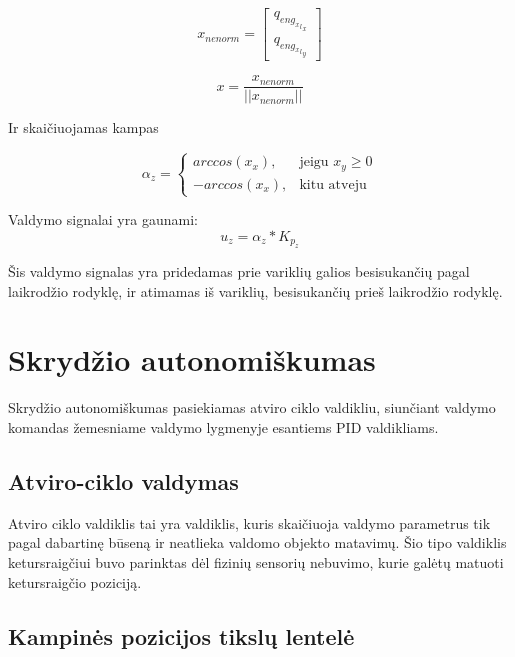 \documentclass[12pt, a4paper, lithuanian, final]{article}
\begin{document}
\begin{equation}
	x_{nenorm} = \left[
		\begin{array}{c}
			q_{{{eng_x}_l}_x} \\
			q_{{{eng_x}_l}_y}
		\end{array}
	\right]
\end{equation}

\begin{equation}
	x = \dfrac{x_{nenorm}}{||x_{nenorm}||}
\end{equation}

Ir skaičiuojamas kampas

\begin{equation}
	\alpha_z = \begin{cases}
		arccos(x_x), & \text{jeigu } x_y \geq 0\\
		-arccos(x_x), & \text{kitu atveju}
	\end{cases}
\end{equation}

Valdymo signalai yra gaunami: 
\begin{equation}
	u_z = \alpha_z * K_{p_z}
\end{equation}

Šis valdymo signalas yra pridedamas prie variklių galios besisukančių pagal laikrodžio rodyklę, ir atimamas iš variklių, besisukančių prieš laikrodžio rodyklę.




\section{Skrydžio autonomiškumas}
\label{skyr-autonomus}

Skrydžio autonomiškumas pasiekiamas atviro ciklo valdikliu, siunčiant valdymo komandas žemesniame valdymo lygmenyje esantiems PID valdikliams.

\subsection{Atviro-ciklo valdymas}

Atviro ciklo valdiklis tai yra valdiklis, kuris skaičiuoja valdymo parametrus tik pagal dabartinę būseną ir neatlieka valdomo objekto matavimų.
Šio tipo valdiklis ketursraigčiui buvo parinktas dėl fizinių sensorių nebuvimo, kurie galėtų matuoti ketursraigčio poziciją.

\subsection{Kampinės pozicijos tikslų lentelė}
\end{document}
